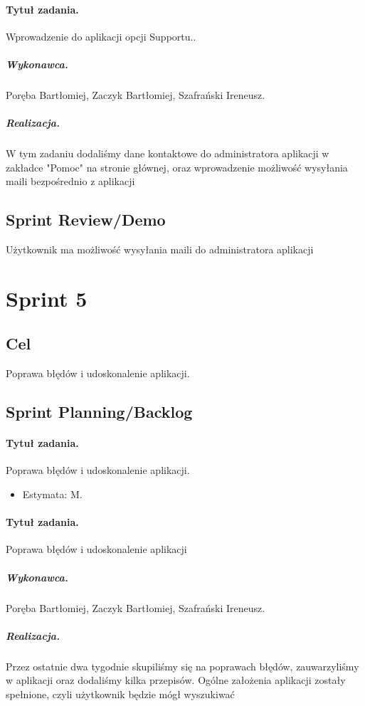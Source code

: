 \documentclass[a4paper]{article}
\begin{document}
	\paragraph{Tytuł zadania.} Wprowadzenie do aplikacji opcji Supportu..
	\subparagraph{Wykonawca.} Poręba Bartłomiej, Zaczyk Bartłomiej, Szafrański Ireneusz.
	\subparagraph{Realizacja.} 
		W tym zadaniu dodaliśmy dane kontaktowe do administratora aplikacji w zakładce "Pomoc" na stronie głównej, oraz wprowadzenie możliwość wysyłania maili bezpośrednio z aplikacji
	
	
	
	\subsection{Sprint Review/Demo}
	Użytkownik ma możliwość wysyłania maili do administratora aplikacji
	
	
	\section{Sprint 5}
	
	\subsection{Cel} Poprawa błędów i udoskonalenie aplikacji.
	
	\subsection{Sprint Planning/Backlog}
	
	\paragraph{Tytuł zadania.} Poprawa błędów i udoskonalenie aplikacji.
	\begin{itemize}
		\item Estymata: M.
	\end{itemize}
	
	
	\paragraph{Tytuł zadania.} Poprawa błędów i udoskonalenie aplikacji
	\subparagraph{Wykonawca.} Poręba Bartłomiej, Zaczyk Bartłomiej, Szafrański Ireneusz.
	\subparagraph{Realizacja.} Przez ostatnie dwa tygodnie skupiliśmy się na poprawach błędów, zauwarzyliśmy w aplikacji oraz dodaliśmy kilka przepisów. Ogólne założenia aplikacji zostały spełnione, czyli użytkownik będzie mógł wyszukiwać 
	
\end{document}
